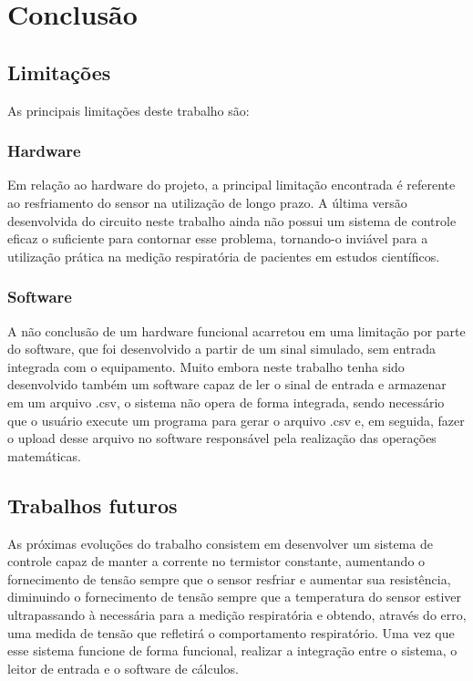   \chapter{Conclusão}
  
  \section{Limitações}
  
  As principais limitações deste trabalho são:
  
  \subsection{Hardware}
  
  Em relação ao hardware do projeto, a principal limitação encontrada é referente ao resfriamento do sensor na utilização de longo prazo. A última versão desenvolvida do circuito neste trabalho ainda não possui um sistema de controle eficaz o suficiente para contornar esse problema, tornando-o inviável para a utilização prática na medição respiratória de pacientes em estudos científicos.
  
  \subsection{Software}
  
  A não conclusão de um hardware funcional acarretou em uma limitação por parte do software, que foi desenvolvido a partir de um sinal simulado, sem entrada integrada com o equipamento. Muito embora neste trabalho tenha sido desenvolvido também um software capaz de ler o sinal de entrada e armazenar em um arquivo .csv, o sistema não opera de forma integrada, sendo necessário que o usuário execute um programa para gerar o arquivo .csv e, em seguida, fazer o upload desse arquivo no software responsável pela realização das operações matemáticas. 

  \section{Trabalhos futuros}
  
  As próximas evoluções do trabalho consistem em desenvolver um sistema de controle capaz de manter a corrente no termistor constante, aumentando o fornecimento de tensão sempre que o sensor resfriar e aumentar sua resistência, diminuindo o fornecimento de tensão sempre que a temperatura do sensor estiver ultrapassando à necessária para a medição respiratória e obtendo, através do erro, uma medida de tensão que refletirá o comportamento respiratório. Uma vez que esse sistema funcione de forma funcional, realizar a integração entre o sistema, o leitor de entrada e o software de cálculos.
  
